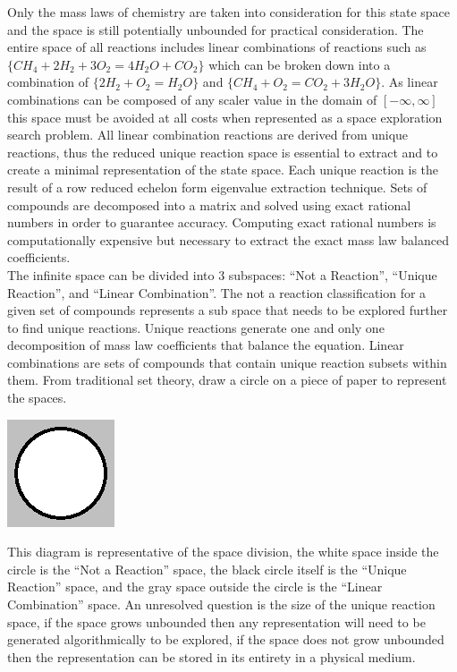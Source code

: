 \documentclass{article}
\begin{document}
Only the mass laws of chemistry are taken into consideration for this state space and the space is still potentially unbounded for practical consideration. The entire space of all reactions includes linear combinations of reactions such as $\{CH_4 + 2H_2 + 3O_2 = 4H_2O + CO_2\}$ which can be broken down into a combination of $\{2H_2 + O_2 = H_2O\}$ and $\{CH_4 + O_2= CO_2 + 3H_2O\}$.  As linear combinations can be composed of any scaler value in the domain of $[-\infty,\infty]$ this space must be avoided at all costs when represented as a space exploration search problem. All linear combination reactions are derived from unique reactions, thus the reduced unique reaction space is essential to extract and to create a minimal representation of the state space. Each unique reaction is the result of a row reduced echelon form eigenvalue extraction technique. Sets of compounds are  decomposed into a matrix and solved using exact rational numbers in order to guarantee accuracy. Computing exact rational numbers is computationally expensive but necessary to extract the exact mass law balanced coefficients. \\

The infinite space can be divided into 3 subspaces: ``Not a Reaction'', ``Unique Reaction'', and ``Linear Combination''. The not a reaction classification for a given set of compounds represents a sub space that needs to be explored further to find unique reactions. Unique reactions generate one and only one decomposition of mass law coefficients that balance the equation. Linear combinations are sets of compounds that contain unique reaction subsets within them. From traditional set theory, draw a circle on a piece of paper to represent the spaces. \\
\begin{center}
	\includegraphics[scale=.5]{circle.eps}\\
\end{center}

This diagram is representative of the space division, the white space inside the circle is the ``Not a Reaction'' space, the black circle itself is the ``Unique Reaction'' space, and the gray space outside the circle is the ``Linear Combination'' space. An unresolved question is the size of the unique reaction space, if the space grows unbounded then any representation will need to be generated algorithmically to be explored, if the space does not grow unbounded then the representation can be stored in its entirety in a physical medium.\\
\end{document}
